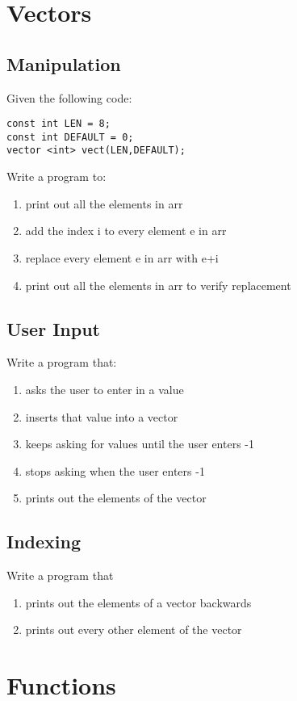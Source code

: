 \documentclass{article}
\begin{document}
\section{Vectors}
\subsection{Manipulation}
Given the following code:
\begin{verbatim}
const int LEN = 8;
const int DEFAULT = 0;
vector <int> vect(LEN,DEFAULT);
\end{verbatim}
Write a program to:
\begin{enumerate}
	\item print out all the elements in arr
	\item add the index i to every element e in arr
	\item replace every element e in arr with e+i
	\item print out all the elements in arr to verify replacement
\end{enumerate}

\subsection{User Input}
Write a program that:
\begin{enumerate}
	\item asks the user to enter in a  value
	\item inserts that value into a vector
	\item keeps asking for values until the user enters -1 
	\item stops asking when the user enters -1 
	\item prints out the elements of the vector
\end{enumerate}

\subsection{Indexing}
Write a program that
\begin{enumerate}
	\item prints out the elements of a vector backwards
	\item prints out every other element of the vector
\end{enumerate}

\pagebreak
\section{Functions}
\end{document}
